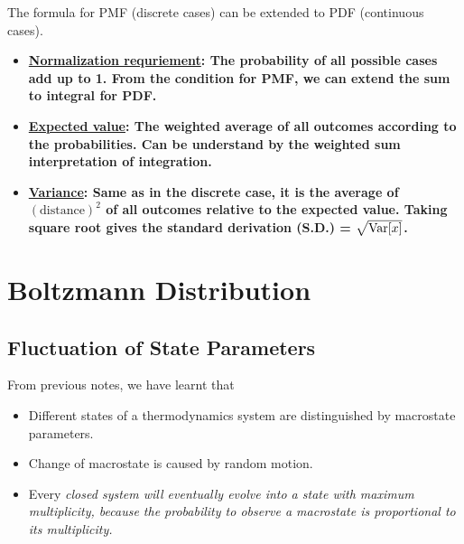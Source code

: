 \documentclass[class=article, crop=false, 12pt]{standalone}
\begin{document}
\newpage
The formula for PMF (discrete cases) can be extended to PDF (continuous cases).
\begin{itemize}
    \item \bf{\ul{Normalization requriement}}: 
    The probability of all possible cases add up to 1.
    From the condition for PMF, we can extend the sum to integral for PDF.

    \item \bf{\ul{Expected value}}: 
    The weighted average of all outcomes according to the probabilities.
    Can be understand by the weighted sum interpretation of integration.

    \item \bf{\ul{Variance}}:
    Same as in the discrete case, it is the average of $(\text{distance})^2$ of all outcomes relative to the expected value.
    Taking square root gives the standard derivation (S.D.) = $\sqrt{\Var{x}}$. 

\end{itemize}


\linesep
\section{Boltzmann Distribution}

\subsection{Fluctuation of State Parameters}

From previous notes, we have learnt that 
\begin{itemize}
    \item Different states of a thermodynamics system are distinguished by macrostate parameters.
    \item Change of macrostate is caused by random motion. 
    \item Every \it{closed} system will eventually evolve into a state with maximum multiplicity, 
    because the probability to observe a macrostate is proportional to its multiplicity.
\end{itemize}
\end{document}

